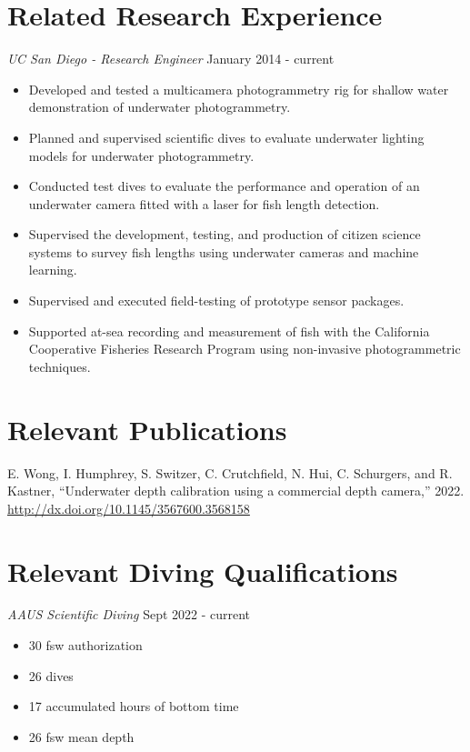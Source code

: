 \documentclass[line,margin]{res}
\begin{document}
\address{9500 Gilman Dr MC0404, La Jolla, CA 92093}
\address{nthui@ucsd.edu, 858.534.9306}
\begin{resume}
    \section{Related Research Experience}
    {\sl UC San Diego - Research Engineer} \hfill January 2014 - current
    \begin{itemize}
		\item Developed and tested a multicamera photogrammetry rig for shallow water demonstration of underwater photogrammetry.
        \item Planned and supervised scientific dives to evaluate underwater lighting models for underwater photogrammetry.
        \item Conducted test dives to evaluate the performance and operation of an underwater camera fitted with a laser for fish length detection.
        \item Supervised the development, testing, and production of citizen science systems to survey fish lengths using underwater cameras and machine learning.
        \item Supervised and executed field-testing of prototype sensor packages.
        \item Supported at-sea recording and measurement of fish with the California Cooperative Fisheries Research Program using non-invasive photogrammetric techniques.
    \end{itemize}

    \section{Relevant Publications}
    E. Wong, I. Humphrey, S. Switzer, C. Crutchfield, N. Hui, C. Schurgers, and R. Kastner, “Underwater depth calibration using a commercial depth camera,” 2022. \url{http://dx.doi.org/10.1145/3567600.3568158}

    \section{Relevant Diving Qualifications}
    {\sl AAUS Scientific Diving} \hfill Sept 2022 - current
    \begin{itemize}
        \item 30 fsw authorization
        \item 26 dives
        \item 17 accumulated hours of bottom time
        \item 26 fsw mean depth
    \end{itemize}


\end{resume}
\end{document}
